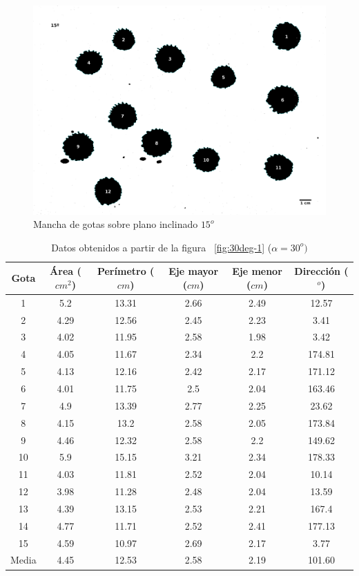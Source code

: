 \begin{figure}[H] \centering
\includegraphics[width=0.66\linewidth]{src/15_deg-1.png} \caption{Mancha de
gotas sobre plano inclinado $15^o$} \label{fig:15deg-1} \end{figure}

\begin{table}[H] \centering \caption{Datos obtenidos a partir de la figura
    ~\ref{fig:30deg-1} ($\alpha=30^o)$} \label{tab:30deg}
    \begin{tabular}{cccccc} \toprule Gota & Área ($cm^2$) & Perímetro ($cm$) &
        Eje mayor ($cm$) & Eje menor ($cm$) & Dirección ($^o$) \\ \midrule 1  &
        5.2  & 13.31 & 2.66 & 2.49 & 12.57  \\ 2  & 4.29 & 12.56 & 2.45 & 2.23
             & 3.41   \\ 3  & 4.02 & 11.95 & 2.58 & 1.98 & 3.42   \\ 4  & 4.05
             & 11.67 & 2.34 & 2.2  & 174.81 \\ 5  & 4.13 & 12.16 & 2.42 & 2.17
             & 171.12 \\ 6  & 4.01 & 11.75 & 2.5  & 2.04 & 163.46 \\ 7  & 4.9
             & 13.39 & 2.77 & 2.25 & 23.62  \\ 8  & 4.15 & 13.2  & 2.58 & 2.05
             & 173.84 \\ 9  & 4.46 & 12.32 & 2.58 & 2.2  & 149.62 \\ 10 & 5.9
             & 15.15 & 3.21 & 2.34 & 178.33 \\ 11 & 4.03 & 11.81 & 2.52 & 2.04
             & 10.14  \\ 12 & 3.98 & 11.28 & 2.48 & 2.04 & 13.59  \\ 13 & 4.39
             & 13.15 & 2.53 & 2.21 & 167.4  \\ 14 & 4.77 & 11.71 & 2.52 & 2.41
             & 177.13 \\ 15 & 4.59 & 10.97 & 2.69 & 2.17 & 3.77   \\ \midrule
    Media & 4.45 & 12.53 & 2.58 & 2.19 & 101.60 \\ \bottomrule \end{tabular}
\end{table}

